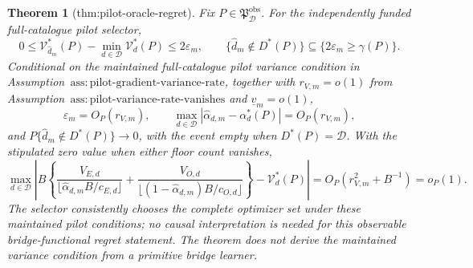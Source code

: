 \documentclass{article}
\newtheorem{theorem}{Theorem}
\begin{document}
\begin{theorem}[thm:pilot-oracle-regret]\label{thm:pilot-oracle-regret}
Fix \(P\in\mathfrak P_{\mathcal D}^{\mathrm{obs}}\). For the independently funded full-catalogue pilot selector,
\[
0\le\mathcal V_{\widehat d_m}^*(P)-\min_{d\in\mathcal D}\mathcal V_d^*(P)\le2\varepsilon_m,
\qquad
\{\widehat d_m\notin D^*(P)\}\subseteq\{2\varepsilon_m\ge\gamma(P)\}.
\]
Conditional on the maintained full-catalogue pilot variance condition in Assumption~\(\mathrm{ass{:}pilot\text{-}gradient\text{-}variance\text{-}rate}\), together with \(r_{V,m}=o(1)\) from Assumption~\(\mathrm{ass{:}pilot\text{-}variance\text{-}rate\text{-}vanishes}\) and \(\underline v_m=o(1)\),
\[
\varepsilon_m=O_P(r_{V,m}),
\qquad
\max_{d\in\mathcal D}|\widehat\alpha_{d,m}-\alpha_d^*(P)|=O_P(r_{V,m}),
\]
and \(P\{\widehat d_m\notin D^*(P)\}\to0\), with the event empty when \(D^*(P)=\mathcal D\). With the stipulated zero value when either floor count vanishes,
\[
\max_{d\in\mathcal D}\left|B\left\{
\frac{V_{E,d}}{\lfloor\widehat\alpha_{d,m}B/c_{E,d}\rfloor}
+\frac{V_{O,d}}{\lfloor(1-\widehat\alpha_{d,m})B/c_{O,d}\rfloor}
\right\}-\mathcal V_d^*(P)\right|
=O_P(r_{V,m}^2+B^{-1})=o_P(1).
\]
The selector consistently chooses the complete optimizer set under these maintained pilot conditions; no causal interpretation is needed for this observable bridge-functional regret statement. The theorem does not derive the maintained variance condition from a primitive bridge learner.
\end{theorem}
\end{document}
